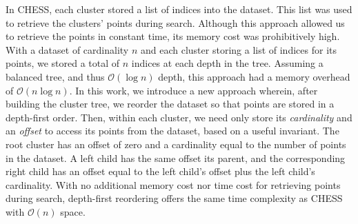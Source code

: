 In CHESS, each cluster stored a list of indices into the dataset.
This list was used to retrieve the clusters' points during search.
Although this approach allowed us to retrieve the points in constant time, its memory cost was prohibitively high.
With a dataset of cardinality $n$ and each cluster storing a list of indices for its points, we stored a total of $n$ indices at each depth in the tree.
Assuming a balanced tree, and thus $\mathcal{O}(\log n)$ depth, this approach had a memory overhead of $\mathcal{O}(n \log n)$.
In this work, we introduce a new approach wherein, after building the cluster tree, we reorder the dataset so that points are stored in a depth-first order.
Then, within each cluster, we need only store its \textit{cardinality} and an \textit{offset} to access its points from the dataset, based on a useful invariant.
The root cluster has an offset of zero and a cardinality equal to the number of points in the dataset.
A left child has the same offset its parent, and the corresponding right child has an offset equal to the left child's offset plus the left child's cardinality.
With no additional memory cost nor time cost for retrieving points during search, depth-first reordering offers the same time complexity as CHESS with $\mathcal{O}(n)$ space.





